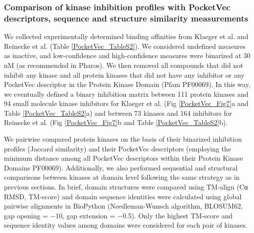 \subsubsection{Comparison of kinase inhibition profiles with PocketVec descriptors, sequence and structure similarity measurements}

We collected experimentally determined binding affinities from Klaeger et al.\cite{klaeger_target_2017} and Reinecke et al.\cite{reinecke_chemical_2023} (Table \ref{PocketVec_TableS2}). We considered undefined measures as inactive, and low-confidence and high-confidence measures were binarized at 30 nM (as recommended in Pharos\cite{nguyen_pharos_2017}). We then removed all compounds that did not inhibit any kinase and all protein kinases that did not have any inhibitor or any PocketVec descriptor in the Protein Kinase Domain (Pfam PF00069). In this way, we eventually defined a binary inhibition matrix between 111 protein kinases and 94 small molecule kinase inhibitors for Klaeger et al. (Fig \ref{PocketVec_Fig7}a and Table \ref{PocketVec_TableS2}a) and between 73 kinases and 164 inhibitors for Reinecke et al. (Fig \ref{PocketVec_Fig7}b and Table \ref{PocketVec_TableS2}b).

We pairwise compared protein kinases on the basis of their binarized inhibition profiles (Jaccard similarity) and their PocketVec descriptors (employing the minimum distance among all PocketVec descriptors within their Protein Kinase Domains PF00069). Additionally, we also performed sequential and structural comparisons between kinases at domain level following the same strategy as in previous sections. In brief, domain structures were compared using TM-align\cite{zhang_tm-align_2005} (Cα RMSD, TM-score) and domain sequence identities were calculated using global pairwise alignments in BioPython\cite{cock_biopython_2009} (Needleman-Wunsch algorithm, BLOSUM62, gap opening = −10, gap extension = −0.5). Only the highest TM-score and sequence identity values among domains were considered for each pair of kinases.
